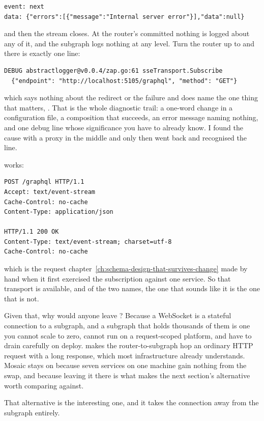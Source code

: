 \begin{verbatim}
event: next
data: {"errors":[{"message":"Internal server error"}],"data":null}
\end{verbatim}

and then the stream closes. At the router's committed 
nothing is logged about any of it, and the subgraph logs nothing at any level.
Turn the router up to  and there is exactly one line:

\begin{verbatim}
DEBUG abstractlogger@v0.0.4/zap.go:61 sseTransport.Subscribe
  {"endpoint": "http://localhost:5105/graphql", "method": "GET"}
\end{verbatim}

which says nothing about the redirect or the failure and does name the one
thing that matters, . That is the whole diagnostic trail:
a one-word change in a configuration file, a composition that succeeds, an
error message naming nothing, and one debug line whose significance you have to
already know. I found the cause with a proxy in the middle and only then went
back and recognised the line.

 works:

\begin{verbatim}
POST /graphql HTTP/1.1
Accept: text/event-stream
Cache-Control: no-cache
Content-Type: application/json

HTTP/1.1 200 OK
Content-Type: text/event-stream; charset=utf-8
Cache-Control: no-cache
\end{verbatim}

which is the request chapter~\ref{ch:schema-design-that-survives-change} made
by hand when it first exercised the subscription against one service. So that
transport is available, and of the two names, the one that sounds like it is
the one that is not.

%
Given that, why would anyone leave ? Because a WebSocket is a
stateful connection to a subgraph, and a subgraph that holds thousands of them
is one you cannot scale to zero, cannot run on a request-scoped platform, and
have to drain carefully on deploy.  makes the router-to-subgraph
hop an ordinary HTTP request with a long response, which most infrastructure
already understands. Mosaic stays on  because seven services on one
machine gain nothing from the swap, and because leaving it there is what makes
the next section's alternative worth comparing against.

\medskip
That alternative is the interesting one, and it takes the connection away from
the subgraph entirely.

%
